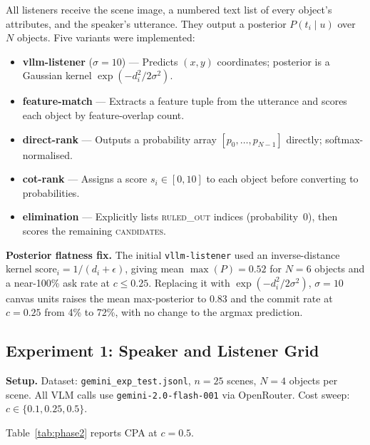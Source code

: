 \documentclass[11pt]{article}
\begin{document}
All listeners receive the scene image, a numbered text list of every object's
attributes, and the speaker's utterance.  They output a posterior
$P(t_i \mid u)$ over $N$ objects.  Five variants were implemented:

\begin{itemize}
    \item \textbf{vllm-listener} ($\sigma{=}10$) --- Predicts $(x,y)$ coordinates;
          posterior is a Gaussian kernel $\exp(-d_i^2/2\sigma^2)$.
    \item \textbf{feature-match} --- Extracts a feature tuple from the utterance
          and scores each object by feature-overlap count.
    \item \textbf{direct-rank} --- Outputs a probability array $[p_0,\ldots,p_{N-1}]$
          directly; softmax-normalised.
    \item \textbf{cot-rank} --- Assigns a score $s_i \in [0,10]$ to each object
          before converting to probabilities.
    \item \textbf{elimination} --- Explicitly lists \textsc{ruled\_out} indices
          (probability~0), then scores the remaining \textsc{candidates}.
\end{itemize}

\textbf{Posterior flatness fix.}
The initial \texttt{vllm-listener} used an inverse-distance kernel
$\text{score}_i = 1/(d_i{+}\epsilon)$, giving mean $\max(P){=}0.52$ for
$N{=}6$ objects and a near-100\% ask rate at $c{\leq}0.25$.
Replacing it with $\exp(-d_i^2/2\sigma^2)$, $\sigma{=}10$ canvas units raises
the mean max-posterior to 0.83 and the commit rate at $c{=}0.25$ from 4\% to 72\%,
with no change to the argmax prediction.

\subsection{Experiment 1: Speaker and Listener Grid}
\label{sec:exp1}

\textbf{Setup.}
Dataset: \texttt{gemini\_exp\_test.jsonl}, $n{=}25$ scenes, $N{=}4$ objects per scene.
All VLM calls use \texttt{gemini-2.0-flash-001} via OpenRouter.
Cost sweep: $c \in \{0.1, 0.25, 0.5\}$.

Table~\ref{tab:phase2} reports CPA at $c{=}0.5$.
\end{document}
